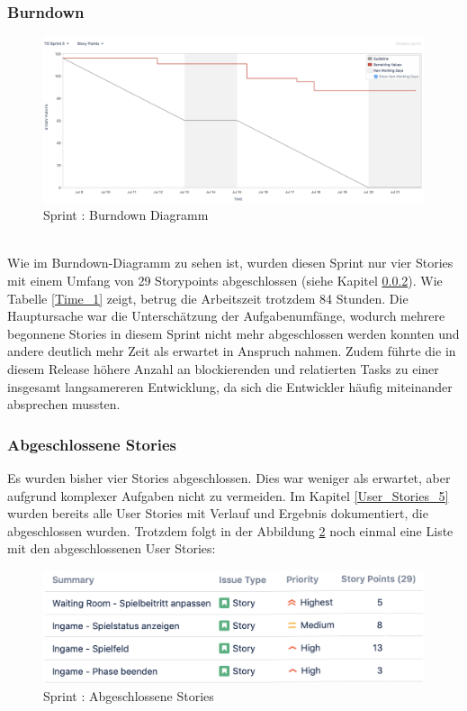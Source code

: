\documentclass[12pt, titlepage]{scrartcl}
\newcommand{\RN}[1]{%
	\textup{\uppercase\expandafter{\romannumeral#1}}%
}
\begin{document}
        	\subsubsection{Burndown}
	        	\begin{figure}[H] 
	        		\centering
	        		\includegraphics[width=\textwidth]{images/sprintV/burndown.png}
	        		\caption{Sprint \RN{5}: Burndown Diagramm}
	        		\label{Burndown_5}
	        	\end{figure}
        		\ \\ Wie im Burndown-Diagramm zu sehen ist, wurden diesen Sprint nur vier Stories mit einem Umfang von 29 Storypoints abgeschlossen (siehe Kapitel \ref{done_stories_5}). Wie Tabelle \ref{Time_1} zeigt, betrug die Arbeitszeit trotzdem 84 Stunden. Die Hauptursache war die Untersch\"atzung der Aufgabenumf\"ange, wodurch mehrere begonnene Stories in diesem Sprint nicht mehr abgeschlossen werden konnten und andere deutlich mehr Zeit als erwartet in Anspruch nahmen. Zudem f\"uhrte die in diesem Release h\"ohere Anzahl an blockierenden und relatierten Tasks zu einer insgesamt langsamereren Entwicklung, da sich die Entwickler h\"aufig miteinander absprechen mussten.
        	\subsubsection{Abgeschlossene Stories} \label{done_stories_5}
        		Es wurden bisher vier Stories abgeschlossen. Dies war weniger als erwartet, aber aufgrund komplexer Aufgaben nicht zu vermeiden. Im Kapitel \ref{User_Stories_5} wurden bereits alle User Stories mit Verlauf und Ergebnis dokumentiert, die abgeschlossen wurden. Trotzdem folgt in der Abbildung \ref{Done_5} noch einmal eine Liste mit den abgeschlossenen User Stories:
        		\begin{figure}[H] 
        			\centering
        			\includegraphics[width=\textwidth]{images/sprintV/doneIssues.png}
        			\caption{Sprint \RN{5}: Abgeschlossene Stories}
        			\label{Done_5}
        		\end{figure}
\end{document}
